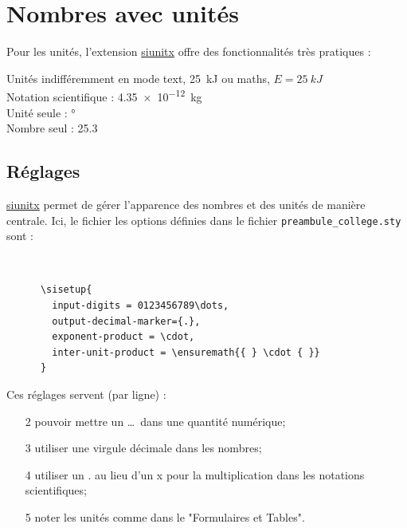 




\section{Nombres avec unités}

Pour les unités, l'extension \href{http://mirror.ctan.org/macros/latex/contrib/siunitx/siunitx.pdf}{siunitx} offre des fonctionnalités très pratiques :
\begin{LTXexample}[pos=o,width=.4]
Unités indifféremment en mode text, \SI{25}{kJ} ou maths, $E = \SI{25}{kJ}$ \\
Notation scientifique : \SI{4.35e-12}{kg} \\
Unité seule : \si{\degree} \\
Nombre seul : \num{25,3}
\end{LTXexample}



\subsection*{Réglages}

\href{http://mirror.ctan.org/macros/latex/contrib/siunitx/siunitx.pdf}{siunitx} permet de gérer l'apparence des nombres et des unités de manière centrale. Ici, le fichier les options définies dans le fichier \texttt{preambule_college.sty} sont : \\

\begin{minipage}{.10\linewidth}
	~
\end{minipage}
\begin{minipage}{.75\linewidth}
	\begin{verbatim}
	  \sisetup{
	    input-digits = 0123456789\dots,
	    output-decimal-marker={.},
	    exponent-product = \cdot,
	    inter-unit-product = \ensuremath{{ } \cdot { }}
	  }
	\end{verbatim}
\end{minipage}

Ces réglages servent (par ligne) :
\begin{itemize}[leftmargin=!]
	\item[2] pouvoir mettre un \dots \ dans une quantité numérique;
	\item[3] utiliser une virgule décimale dans les nombres;
	\item[4] utiliser un . au lieu d'un x pour la multiplication dans les notations scientifiques;
	\item[5] noter les unités comme dans le "Formulaires et Tables".
\end{itemize}



